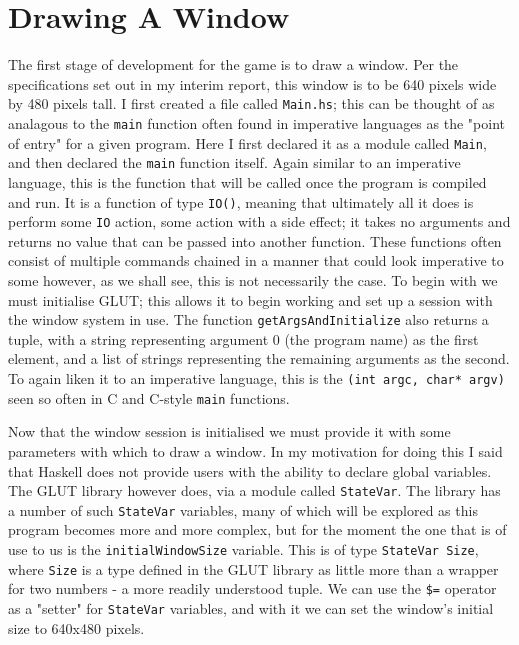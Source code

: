 \documentclass[12pt, a4paper]{report}
\begin{document}
\maketitle

\tableofcontents
\pagebreak

\section{Drawing A Window}

The first stage of development for the game is to draw a window.
Per the specifications set out in my interim report, this window is to be 640 pixels wide by 480 pixels tall.
I first created a file called \verb|Main.hs|; this can be thought of as analagous to the \verb|main| function often found in imperative languages as the "point of entry" for a given program.
Here I first declared it as a module called \verb|Main|, and then declared the \verb|main| function itself.
Again similar to an imperative language, this is the function that will be called once the program is compiled and run.
It is a function of type \verb|IO()|, meaning that ultimately all it does is perform some \verb|IO| action, some action with a side effect; it takes no arguments and returns no value that can be passed into another function.
These functions often consist of multiple commands chained in a manner that could look imperative to some however, as we shall see, this is not necessarily the case.
To begin with we must initialise GLUT; this allows it to begin working and set up a session with the window system in use.
The function \verb|getArgsAndInitialize| also returns a tuple, with a string representing argument 0 (the program name) as the first element, and a list of strings representing the remaining arguments as the second.
To again liken it to an imperative language, this is the \verb|(int argc, char* argv)| seen so often in C and C-style \verb|main| functions.

\par

Now that the window session is initialised we must provide it with some parameters with which to draw a window.
In my motivation for doing this I said that Haskell does not provide users with the ability to declare global variables.
The GLUT library however does, via a module called \verb|StateVar|.
The library has a number of such \verb|StateVar| variables, many of which will be explored as this program becomes more and more complex, but for the moment the one that is of use to us is the \verb|initialWindowSize| variable.
This is of type \verb|StateVar Size|, where \verb|Size| is a type defined in the GLUT library as little more than a wrapper for two numbers - a more readily understood tuple.
We can use the \verb|$=| operator as a "setter" for \verb|StateVar| variables, and with it we can set the window's initial size to 640x480 pixels.
\end{document}
